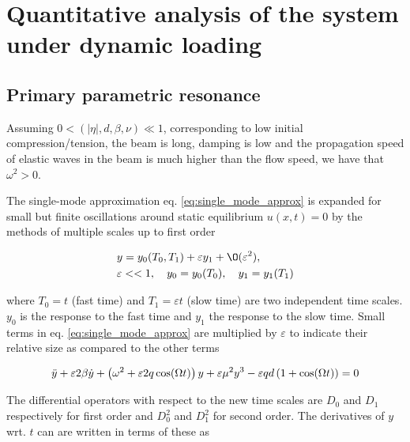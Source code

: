 
\section[Quantitative analysis]{Quantitative analysis of the system under
  dynamic loading}
\label{sec:5}

\subsection{Primary parametric resonance}
\label{sec:prim-param-reson}

Assuming $0<(|\eta|,d,\beta,\nu) \ll 1$, corresponding to low initial
compression/tension, the beam is long, damping is low and the propagation speed
of elastic waves in the beam is much higher than the flow speed, we have that
$\omega^2>0$.

The single-mode approximation eq. \eqref{eq:single_mode_approx} is expanded for
small but finite oscillations around static equilibrium $u(x,t)=0$ by the
methods of multiple scales \cite{juel2003a} up to first order

\begin{equation}
  \begin{split}
    \label{eq:multi_scales_approx}
    &y = y_{0}(T_0,T_1)+\varepsilon y_{1} + \O(\varepsilon^{2}), \\
    &\varepsilon << 1, \quad y_{0} = y_{0}(T_{0}), \quad y_{1} = y_{1}(T_{1})
  \end{split}
\end{equation}

where $T_{0}=t$ (fast time) and $T_{1}=\varepsilon t$ (slow time) are two
independent time scales. $y_0$ is the response to the fast time and $y_1$ the
response to the slow time. Small terms in eq. \eqref{eq:single_mode_approx} are
multiplied by $\varepsilon$ to indicate their relative size as compared to the
other terms

\begin{equation}
  \label{eq:5_3}
  \ddot y + \varepsilon 2\beta\dot y \\
  + \left( \omega^2 + \varepsilon 2q \cos(\Omega t) \right)y \\
  + \varepsilon \mu^2y^3 - \varepsilon qd \left( 1+\cos(\Omega t) \right) = 0
\end{equation}


The differential operators with respect to the new time scales are $D_{0}$ and
$D_{1}$ respectively for first order and $D_{0}^{2}$ and $D_{1}^{2}$ for second
order. The derivatives of $y$ wrt. $t$ can are written in terms of these as


